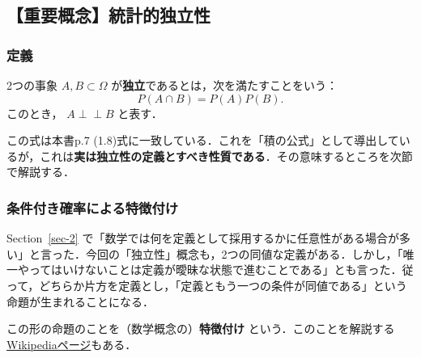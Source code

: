 \documentclass[
  letterpaper,
  DIV=11,
  numbers=noendperiod]{scrartcl}
\begin{document}
\subsection{【重要概念】統計的独立性}\label{sec-independent}

\subsubsection{定義}\label{ux5b9aux7fa9}

\begin{tcolorbox}[enhanced jigsaw, toprule=.15mm, leftrule=.75mm, titlerule=0mm, bottomtitle=1mm, title={定義（独立性）}, arc=.35mm, toptitle=1mm, colbacktitle=quarto-callout-tip-color!10!white, coltitle=black, rightrule=.15mm, colback=white, opacityback=0, colframe=quarto-callout-tip-color-frame, opacitybacktitle=0.6, left=2mm, breakable, bottomrule=.15mm]

2つの事象 \(A,B\subset\Omega\)
が\textbf{独立}であるとは，次を満たすことをいう： \[
P(A\cap B)=P(A)P(B).
\] このとき， \(A\perp\!\!\!\perp B\) と表す．

\end{tcolorbox}

この式は本書p.7
(1.8)式に一致している．これを「積の公式」として導出しているが，これは\textbf{実は独立性の定義とすべき性質である}．その意味するところを次節で解説する．

\subsubsection{条件付き確率による特徴付け}\label{ux6761ux4ef6ux4ed8ux304dux78baux7387ux306bux3088ux308bux7279ux5fb4ux4ed8ux3051}

Section~\ref{sec-2}
で「数学では何を定義として採用するかに任意性がある場合が多い」と言った．今回の「独立性」概念も，2つの同値な定義がある．しかし，「唯一やってはいけないことは定義が曖昧な状態で進むことである」とも言った．従って，どちらか片方を定義とし，「定義ともう一つの条件が同値である」という命題が生まれることになる．

この形の命題のことを（数学概念の）\textbf{特徴付け}
という．このことを解説する\href{https://ja.wikipedia.org/wiki/\%E7\%89\%B9\%E5\%BE\%B4\%E3\%81\%A5\%E3\%81\%91_(\%E6\%95\%B0\%E5\%AD\%A6)}{Wikipediaページ}もある．
\end{document}
